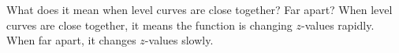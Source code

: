 {What does it mean when level curves are close together? Far apart?}
{When level curves are close together, it means the function is changing $z$-values rapidly. When far apart, it changes $z$-values slowly.}
